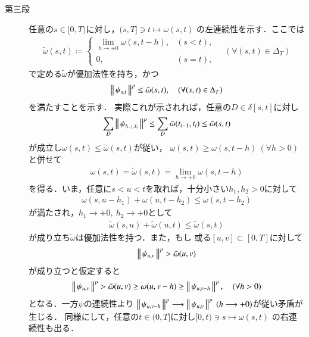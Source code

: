 \begin{prf}
\begin{description}
			\item[第三段]
				任意の$s \in [0,T)$に対し，$(s,T] \ni t \longmapsto \omega(s,t)$
				の左連続性を示す．ここでは
				\begin{align}
					\tilde{\omega}(s,t) \coloneqq 
					\begin{cases}
						\lim_{h \to +0}\omega(s,t-h), & (s < t), \\
						0, & (s=t),
					\end{cases}
					\quad (\forall (s,t) \in \Delta_T)
				\end{align}
				で定める$\tilde{\omega}$が優加法性を持ち，かつ
				\begin{align}
					\left\|\, \psi_{s,t}\, \right\|_{}^p \leq \tilde{\omega}(s,t),
					\quad (\forall (s,t) \in \Delta_T)
				\end{align}
				を満たすことを示す．
				実際これが示されれば，任意の$D \in \delta[s,t]$に対し
				\begin{align}
					\sum_D \left\|\, \psi_{t_{i-1},t_i}\, \right\|_{}^p
					\leq \sum_D \tilde{\omega}(t_{i-1},t_i)
					\leq \tilde{\omega}(s,t)
				\end{align}
				が成立し$\omega(s,t) \leq \tilde{\omega}(s,t)$が従い，
				$\omega(s,t) \geq \omega(s,t-h)\ (\forall h > 0)$と併せて
				\begin{align}
					\omega(s,t) = \tilde{\omega}(s,t) = \lim_{h \to +0} \omega(s,t-h)
				\end{align}
				を得る．いま，任意に$s < u < t$を取れば，十分小さい$h_1,h_2 > 0$に対して
				\begin{align}	
					\omega(s,u-h_1) + \omega(u,t-h_2) \leq \omega(s,t-h_2)
				\end{align}
				が満たされ，$h_1 \longrightarrow +0,\ h_2 \longrightarrow +0$として
				\begin{align}
					\tilde{\omega}(s,u) + \tilde{\omega}(u,t) \leq \tilde{\omega}(s,t)
				\end{align}
				が成り立ち$\tilde{\omega}$は優加法性を持つ．また，もし
				或る$[u,v] \subset [0,T]$に対して
				\begin{align}
					\left\|\, \psi_{u,v}\, \right\|_{}^p > \tilde{\omega}(u,v)
				\end{align}
				が成り立つと仮定すると
				\begin{align}
					\left\|\, \psi_{u,v}\, \right\|_{}^p > \tilde{\omega}(u,v) \geq \omega(u,v-h) \geq \left\|\, \psi_{u,v-h}\, \right\|_{}^p,
					\quad (\forall h > 0)
				\end{align}
				となる．一方$\psi$の連続性より
				$\left\|\, \psi_{u,v-h}\, \right\|_{}^p \longrightarrow \left\|\, \psi_{u,v}\, \right\|_{}^p\ (h \longrightarrow +0)$が従い矛盾が生じる．
				同様にして，任意の$t \in (0,T]$に対し$[0,t) \ni s \longmapsto \omega(s,t)$
				の右連続性も出る．
				

\end{description}
\end{prf}
